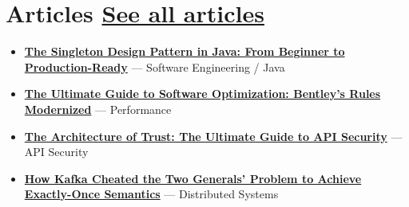 


\section*{Articles \hfill  
\href{https://medium.com/@HarshanaLF}{See all articles}} 
\BigDivider 
 
\small 
\begin{itemize}[leftmargin=*, itemsep=0.2em, topsep=0.1em] 
  \item \textbf{\href{https://medium.com/@HarshanaLF/the-singleton-design-pattern-in-java-from-beginner-to-production-ready-a8b037c3d8c2}{The Singleton Design Pattern in Java: From Beginner to Production-Ready}} --- Software Engineering / Java 
  \item \textbf{\href{https://medium.com/@HarshanaLF/the-ultimate-guide-to-software-optimization-bentleys-rules-modernized-084b6789e0bc}{The Ultimate Guide to Software Optimization: Bentley's Rules Modernized}} --- Performance 
  \item \textbf{\href{https://medium.com/@HarshanaLF/the-architecture-of-trust-the-ultimate-guide-to-api-security-f0b90bcee736}{The Architecture of Trust: The Ultimate Guide to API Security}} --- API Security 
  \item \textbf{\href{https://medium.com/@HarshanaLF/how-kafka-cheated-the-two-generals-problem-to-achieve-exactly-once-semantics-0c7848c5bb21}{How Kafka Cheated the Two Generals' Problem to Achieve Exactly-Once Semantics}} --- Distributed Systems 
\end{itemize} 
\normalsize
